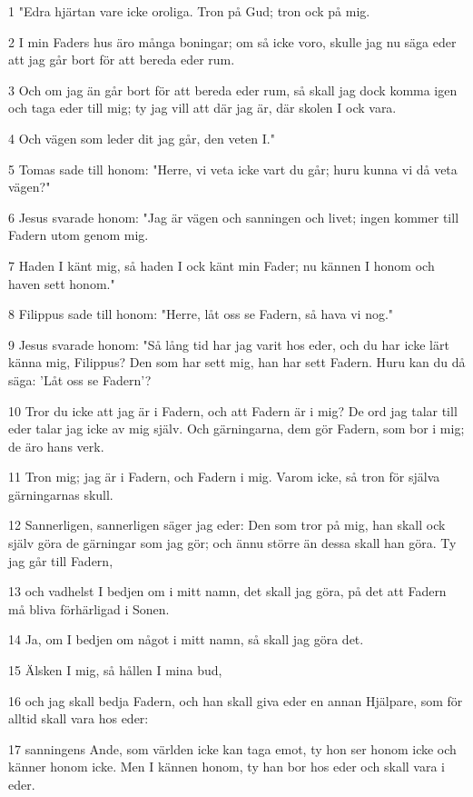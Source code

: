 \par 1 "Edra hjärtan vare icke oroliga. Tron på Gud; tron ock på mig.
\par 2 I min Faders hus äro många boningar; om så icke voro, skulle jag nu säga eder att jag går bort för att bereda eder rum.
\par 3 Och om jag än går bort för att bereda eder rum, så skall jag dock komma igen och taga eder till mig; ty jag vill att där jag är, där skolen I ock vara.
\par 4 Och vägen som leder dit jag går, den veten I."
\par 5 Tomas sade till honom: "Herre, vi veta icke vart du går; huru kunna vi då veta vägen?"
\par 6 Jesus svarade honom: "Jag är vägen och sanningen och livet; ingen kommer till Fadern utom genom mig.
\par 7 Haden I känt mig, så haden I ock känt min Fader; nu kännen I honom och haven sett honom."
\par 8 Filippus sade till honom: "Herre, låt oss se Fadern, så hava vi nog."
\par 9 Jesus svarade honom: "Så lång tid har jag varit hos eder, och du har icke lärt känna mig, Filippus? Den som har sett mig, han har sett Fadern. Huru kan du då säga: 'Låt oss se Fadern'?
\par 10 Tror du icke att jag är i Fadern, och att Fadern är i mig? De ord jag talar till eder talar jag icke av mig själv. Och gärningarna, dem gör Fadern, som bor i mig; de äro hans verk.
\par 11 Tron mig; jag är i Fadern, och Fadern i mig. Varom icke, så tron för själva gärningarnas skull.
\par 12 Sannerligen, sannerligen säger jag eder: Den som tror på mig, han skall ock själv göra de gärningar som jag gör; och ännu större än dessa skall han göra. Ty jag går till Fadern,
\par 13 och vadhelst I bedjen om i mitt namn, det skall jag göra, på det att Fadern må bliva förhärligad i Sonen.
\par 14 Ja, om I bedjen om något i mitt namn, så skall jag göra det.
\par 15 Älsken I mig, så hållen I mina bud,
\par 16 och jag skall bedja Fadern, och han skall giva eder en annan Hjälpare, som för alltid skall vara hos eder:
\par 17 sanningens Ande, som världen icke kan taga emot, ty hon ser honom icke och känner honom icke. Men I kännen honom, ty han bor hos eder och skall vara i eder.

